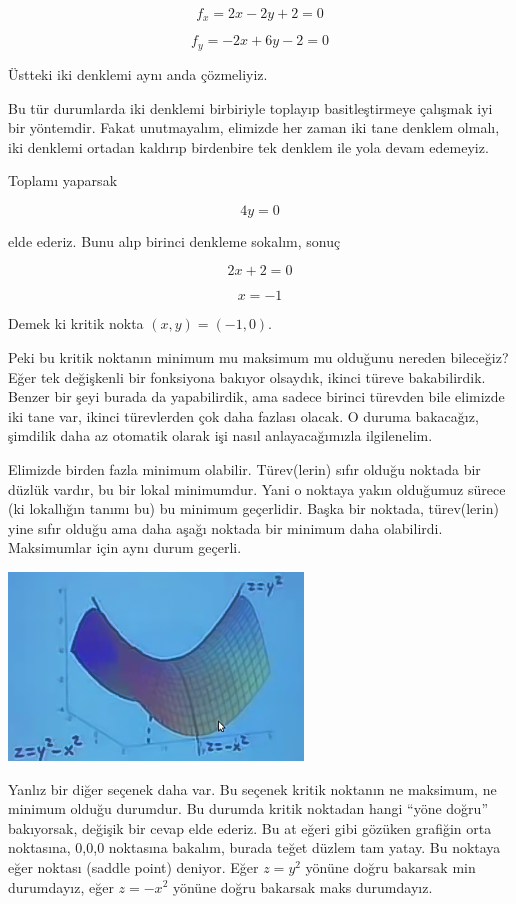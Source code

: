 \documentclass[12pt,fleqn]{article}\usepackage{../../common}
\begin{document}
$$ f_x = 2x - 2y + 2 = 0$$

$$ f_y = -2x + 6y - 2 = 0 $$

Üstteki iki denklemi aynı anda çözmeliyiz. 

Bu tür durumlarda iki denklemi birbiriyle toplayıp basitleştirmeye çalışmak iyi
bir yöntemdir. Fakat unutmayalım, elimizde her zaman iki tane denklem olmalı,
iki denklemi ortadan kaldırıp birdenbire tek denklem ile yola devam edemeyiz.

Toplamı yaparsak

$$ 4y = 0 $$

elde ederiz. Bunu alıp birinci denkleme sokalım, sonuç

$$ 2x + 2 = 0 $$

$$ x = -1 $$

Demek ki kritik nokta $(x,y) = (-1,0)$. 

Peki bu kritik noktanın minimum mu maksimum mu olduğunu nereden bileceğiz?  Eğer
tek değişkenli bir fonksiyona bakıyor olsaydık, ikinci türeve
bakabilirdik. Benzer bir şeyi burada da yapabilirdik, ama sadece birinci
türevden bile elimizde iki tane var, ikinci türevlerden çok daha fazlası
olacak. O duruma bakacağız, şimdilik daha az otomatik olarak işi nasıl
anlayacağımızla ilgilenelim.

Elimizde birden fazla minimum olabilir. Türev(lerin) sıfır olduğu noktada bir
düzlük vardır, bu bir lokal minimumdur. Yani o noktaya yakın olduğumuz sürece
(ki lokallığın tanımı bu) bu minimum geçerlidir. Başka bir noktada, türev(lerin)
yine sıfır olduğu ama daha aşağı noktada bir minimum daha
olabilirdi. Maksimumlar için aynı durum geçerli.

\begin{center}
\includegraphics[height=5cm]{9_4.png}
\end{center}

Yanlız bir diğer seçenek daha var. Bu seçenek kritik noktanın ne maksimum, ne
minimum olduğu durumdur. Bu durumda kritik noktadan hangi ``yöne doğru''
bakıyorsak, değişik bir cevap elde ederiz. Bu at eğeri gibi gözüken grafiğin
orta noktasına, 0,0,0 noktasına bakalım, burada teğet düzlem tam yatay. Bu
noktaya eğer noktası (saddle point) deniyor. Eğer $z=y^2$ yönüne doğru bakarsak
min durumdayız, eğer $z=-x^2$ yönüne doğru bakarsak maks durumdayız.
\end{document}
